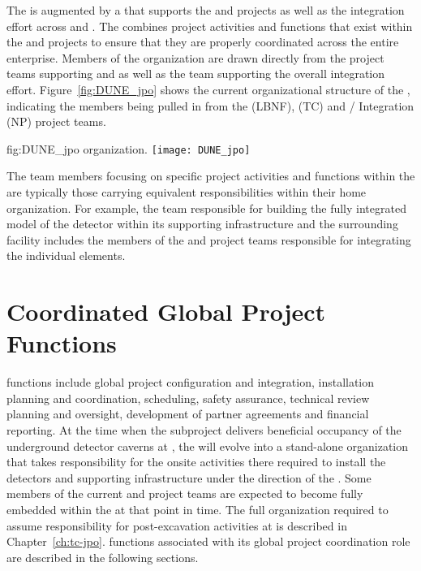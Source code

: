 The  is augmented by a  that supports the
 and  projects as well as the integration
effort across  and . The  combines
project activities and functions that exist within the  and 
projects to ensure that they are properly coordinated across the
entire enterprise.  Members of the  organization are drawn directly
from the project teams supporting  and  as well as the team
supporting the overall integration effort.  Figure~\ref{fig:DUNE_jpo} shows the
current organizational structure of the , indicating the members
being pulled in from the  (LBNF),  (TC) and /
Integration (NP) project teams.
\begin{dunefigure}{fig:DUNE_jpo}
  { organization.}
  \texttt{[image: DUNE\_jpo]}
\end{dunefigure}
The team members focusing on specific project activities and functions
within the  are typically those carrying equivalent
responsibilities within their home organization.  For example, the
 team responsible for building the fully integrated model
of the detector within its supporting infrastructure and the
surrounding facility includes the members of the  and
 project teams responsible for integrating the individual
elements.

\section{Coordinated Global Project Functions}
\label{sec:global_project}

 functions include global project configuration and integration,
installation planning and coordination, scheduling, safety assurance,
technical review planning and oversight, development of partner
agreements and financial reporting.  At the time when the 
 subproject delivers beneficial occupancy of
the underground detector caverns at , the  will evolve into a
stand-alone organization that takes responsibility for the onsite
activities %
there required to install the detectors and supporting
infrastructure under the direction of the .
Some members of the current  and  project teams are
expected to become fully embedded within the  at that point in
time.  The full  organization required to assume responsibility for
post-excavation activities at  is described in Chapter~\ref{ch:tc-jpo}.
 functions associated with its global project coordination role
are described in the following sections.

